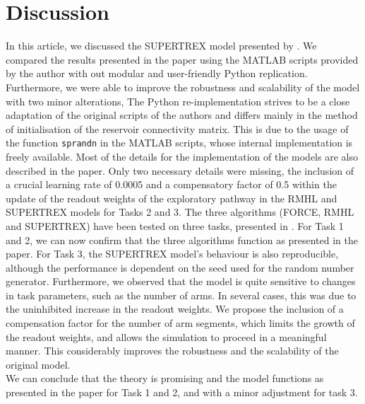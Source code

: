 \section{Discussion}

In this article, we discussed the SUPERTREX model presented by
\textcite{pyle2019}. We compared the results presented in the paper
using the MATLAB scripts provided by the author with out modular and
user-friendly Python replication. Furthermore, we were able to improve
the robustness and scalability of the model with two minor alterations,
%
The Python re-implementation strives to be a close adaptation of the
original scripts of the authors and differs mainly in the method of
initialisation of the reservoir connectivity matrix. This is due to
the usage of the function {\tt sprandn} in the MATLAB scripts, whose
internal implementation is freely available. Most of the details for
the implementation of the models are also described in the paper. Only
two necessary details were missing, the inclusion of a crucial
learning rate of 0.0005 and a compensatory factor of 0.5 within the
update of the readout weights of the exploratory pathway in the RMHL
and SUPERTREX models for Tasks 2 and 3.
%
The three algorithms (FORCE, RMHL and SUPERTREX) have been tested on
three tasks, presented in \textcite{pyle2019}. For Task 1 and 2, we
can now confirm that the three algorithms function as presented in the
paper. For Task 3, the SUPERTREX model's behaviour is also
reproducible, although the performance is dependent on the seed used
for the random number generator. Furthermore, we observed that the
model is quite sensitive to changes in task parameters, such as the
number of arms. In several cases, this was due to the uninhibited
increase in the readout weights. We propose the inclusion of a
compensation factor for the number of arm segments, which limits the
growth of the readout weights, and allows the simulation to proceed in
a meaningful manner. This considerably improves the robustness and the
scalability of the original model.\\

We can conclude that the theory is promising and the model functions
as presented in the paper for Task 1 and 2, and with a minor adjustment
for task 3.



